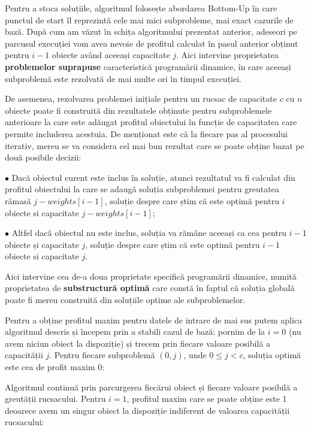 \begin{sloppypar}
Pentru a stoca soluțiile, algoritmul folosește abordarea Bottom-Up în care punctul de start îl reprezintă cele mai mici subprobleme, mai exact cazurile de bază. După cum am văzut în schița algoritmului prezentat anterior, adeseori pe parcusul execuției vom avea nevoie de profitul calculat în pasul anterior obținut pentru \(i - 1\) obiecte având aceeași capacitate \(j\). Aici intervine proprietatea \textbf{problemelor suprapuse} caracteristică programării dinamice, în care aceeași subproblemă este rezolvată de mai multe ori în timpul execuției. \par
De asemenea, rezolvarea problemei inițiale pentru un rucsac de capacitate \(c\) cu \(n\) obiecte poate fi construită din rezultatele obținute pentru subproblemele anterioare la care este adăugat profitul obiectului în funcție de capacitatea care permite includerea acestuia. De menționat este că la fiecare pas al procesului iterativ, mereu se va considera cel mai bun rezultat care se poate obține bazat pe două posibile decizii: \par
$\bullet$ Dacă obiectul curent este inclus în soluție, atunci rezultatul va fi calculat din profitul obiectului la care se adaugă soluția subproblemei pentru greutatea rămasă \(j - weights[i - 1]\), soluție despre care știm că este optimă pentru \(i\) obiecte si capacitate \(j - weights[i - 1]\); \par
$\bullet$ Altfel dacă obiectul nu este inclus, soluția va rămâne aceeași ca cea pentru \(i - 1\) obiecte și capacitate \(j\), soluție despre care știm că este optimă pentru \(i - 1\) obiecte si capacitate \(j\). \par
Aici intervine cea de-a doua proprietate specifică programării dinamice, numită proprietatea de \textbf{substructură optimă} care constă în faptul că soluția globală poate fi mereu construită din soluțiile optime ale subproblemelor.
\\ \par
Pentru a obține profitul maxim pentru datele de intrare de mai sus putem aplica algoritmul descris și începem prin a stabili cazul de bază: pornim de la $i = 0$ (nu avem niciun obiect la dispoziție) și trecem prin fiecare valoare posibilă a capacității $j$. Pentru fiecare subproblemă $(0, j)$, unde $0 \le j < c $, soluția optimă este cea de profit maxim 0:


Algoritmul continuă prin parcurgerea fiecărui obiect și fiecare valoare posibilă a greutății rucsacului. Pentru $i = 1$, profitul maxim care se poate obține este 1 deoarece avem un singur obiect la dispoziție indiferent de valoarea capacității rucsacului: 


\end{sloppypar}
